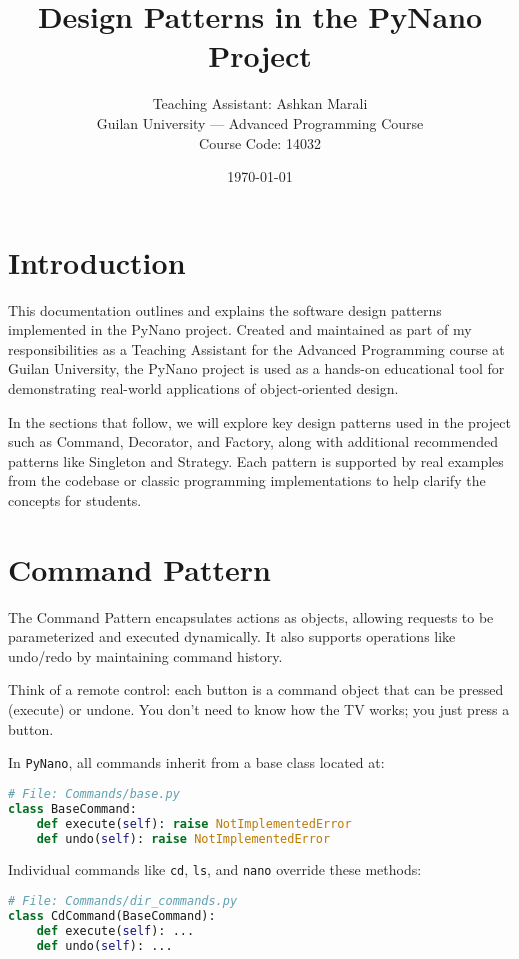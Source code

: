 \documentclass[12pt]{article}
\title{Design Patterns in the PyNano Project}
\author{Teaching Assistant: Ashkan Marali \\
Guilan University — Advanced Programming Course \\
Course Code: 14032}
\date{\today}
\begin{document}
\maketitle

\section*{Introduction}
This documentation outlines and explains the software design patterns implemented in the PyNano project. Created and maintained as part of my responsibilities as a Teaching Assistant for the Advanced Programming course at Guilan University, the PyNano project is used as a hands-on educational tool for demonstrating real-world applications of object-oriented design.

In the sections that follow, we will explore key design patterns used in the project such as Command, Decorator, and Factory, along with additional recommended patterns like Singleton and Strategy. Each pattern is supported by real examples from the codebase or classic programming implementations to help clarify the concepts for students.


\section{Command Pattern}
The Command Pattern encapsulates actions as objects, allowing requests to be parameterized and executed dynamically. It also supports operations like undo/redo by maintaining command history.

Think of a remote control: each button is a command object that can be pressed (execute) or undone. You don’t need to know how the TV works; you just press a button.

In \texttt{PyNano}, all commands inherit from a base class located at:

\begin{lstlisting}[language=Python]
# File: Commands/base.py
class BaseCommand:
    def execute(self): raise NotImplementedError
    def undo(self): raise NotImplementedError
\end{lstlisting}

Individual commands like \texttt{cd}, \texttt{ls}, and \texttt{nano} override these methods:

\begin{lstlisting}[language=Python]
# File: Commands/dir_commands.py
class CdCommand(BaseCommand):
    def execute(self): ...
    def undo(self): ...
\end{lstlisting}
\end{document}
